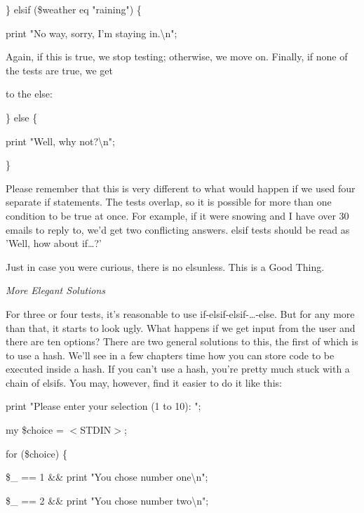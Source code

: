 \documentclass[a4paper,11pt]{book}
\begin{document}
\noindent 

\noindent \} elsif (\$weather eq "raining") \{

\noindent print "No way, sorry, I'm staying in.\textbackslash n";

\noindent 

\noindent 

\noindent Again, if this is true, we stop testing; otherwise, we move on. Finally, if none of the tests are true, we get

\noindent to the else:

\noindent 

\noindent \} else \{

\noindent print "Well, why not?\textbackslash n";

\noindent \}

\noindent 

\noindent Please remember that this is very different to what would happen if we used four separate if statements. The tests overlap, so it is possible for more than one condition to be true at once. For example, if it were snowing and I have over 30 emails to reply to, we'd get two conflicting answers. elsif tests should be read as 'Well, how about if\dots ?'

\noindent 

\noindent Just in case you were curious, there is no elsunless. This is a Good Thing.

\noindent 

\noindent \textit{More Elegant Solutions}

\noindent For three or four tests, it's reasonable to use if-elsif-elsif-\dots -else. But for any more than that, it starts to look ugly. What happens if we get input from the user and there are ten options? There are two general solutions to this, the first of which is to use a hash. We'll see in a few chapters time how you can store code to be executed inside a hash. If you can't use a hash, you're pretty much stuck with a chain of elsifs. You may, however, find it easier to do it like this:

\noindent 

\noindent print "Please enter your selection (1 to 10): ";

\noindent my \$choice = $<$STDIN$>$;

\noindent for (\$choice) \{

\noindent \$\_  == 1 \&\& print "You chose number one\textbackslash n";

\noindent \$\_  == 2 \&\& print "You chose number two\textbackslash n";
\end{document}
